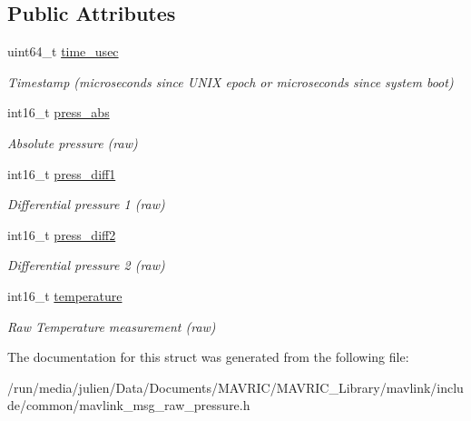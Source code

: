 \subsection*{Public Attributes}
\begin{DoxyCompactItemize}
\item 
\hypertarget{struct____mavlink__raw__pressure__t_a659746eb22bad8e9e29aac0efcba19d2}{uint64\+\_\+t \hyperlink{struct____mavlink__raw__pressure__t_a659746eb22bad8e9e29aac0efcba19d2}{time\+\_\+usec}}\label{struct____mavlink__raw__pressure__t_a659746eb22bad8e9e29aac0efcba19d2}

\begin{DoxyCompactList}\small\item\em Timestamp (microseconds since U\+N\+I\+X epoch or microseconds since system boot) \end{DoxyCompactList}\item 
\hypertarget{struct____mavlink__raw__pressure__t_aab16fd5b27c766d69df4ffa252d573e3}{int16\+\_\+t \hyperlink{struct____mavlink__raw__pressure__t_aab16fd5b27c766d69df4ffa252d573e3}{press\+\_\+abs}}\label{struct____mavlink__raw__pressure__t_aab16fd5b27c766d69df4ffa252d573e3}

\begin{DoxyCompactList}\small\item\em Absolute pressure (raw) \end{DoxyCompactList}\item 
\hypertarget{struct____mavlink__raw__pressure__t_ae53766b9335fa7900b3a72daca467b70}{int16\+\_\+t \hyperlink{struct____mavlink__raw__pressure__t_ae53766b9335fa7900b3a72daca467b70}{press\+\_\+diff1}}\label{struct____mavlink__raw__pressure__t_ae53766b9335fa7900b3a72daca467b70}

\begin{DoxyCompactList}\small\item\em Differential pressure 1 (raw) \end{DoxyCompactList}\item 
\hypertarget{struct____mavlink__raw__pressure__t_a7b832c03aaa2a3f55e309d590d9fc93b}{int16\+\_\+t \hyperlink{struct____mavlink__raw__pressure__t_a7b832c03aaa2a3f55e309d590d9fc93b}{press\+\_\+diff2}}\label{struct____mavlink__raw__pressure__t_a7b832c03aaa2a3f55e309d590d9fc93b}

\begin{DoxyCompactList}\small\item\em Differential pressure 2 (raw) \end{DoxyCompactList}\item 
\hypertarget{struct____mavlink__raw__pressure__t_a7d57fd80130f0588285f03669bf8c016}{int16\+\_\+t \hyperlink{struct____mavlink__raw__pressure__t_a7d57fd80130f0588285f03669bf8c016}{temperature}}\label{struct____mavlink__raw__pressure__t_a7d57fd80130f0588285f03669bf8c016}

\begin{DoxyCompactList}\small\item\em Raw Temperature measurement (raw) \end{DoxyCompactList}\end{DoxyCompactItemize}


The documentation for this struct was generated from the following file\+:\begin{DoxyCompactItemize}
\item 
/run/media/julien/\+Data/\+Documents/\+M\+A\+V\+R\+I\+C/\+M\+A\+V\+R\+I\+C\+\_\+\+Library/mavlink/include/common/mavlink\+\_\+msg\+\_\+raw\+\_\+pressure.\+h\end{DoxyCompactItemize}

